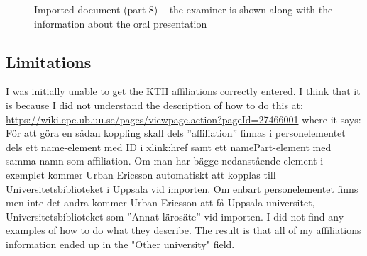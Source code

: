\begin{figure}[!ht]
  \begin{center}
  \end{center}
  \caption[Imported document (part 8)]{Imported document (part 8) – the examiner is shown along with the information about the oral presentation}
  \label{fig:divaImport12}
\end{figure}
\clearpage


	

\subsection{Limitations}
I was initially unable to get the KTH affiliations correctly entered. I think that it is because I did not understand the description of how to do this at: \url{ https://wiki.epc.ub.uu.se/pages/viewpage.action?pageId=27466001}  where it says:
För att göra en sådan koppling skall dels ”affiliation” finnas i personelementet dels ett name-element med ID i xlink:href samt ett namePart-element med samma namn som affiliation. Om man har bägge nedanstående element i exemplet kommer Urban Ericsson automatiskt att kopplas till Universitetsbiblioteket i Uppsala vid importen. Om enbart personelementet finns men inte det andra kommer Urban Ericsson att få Uppsala universitet, Universitetsbiblioteket som ”Annat lärosäte” vid importen.
I did not find any examples of how to do what they describe. The result is that all of my affiliations information ended up in the "Other university" field.

